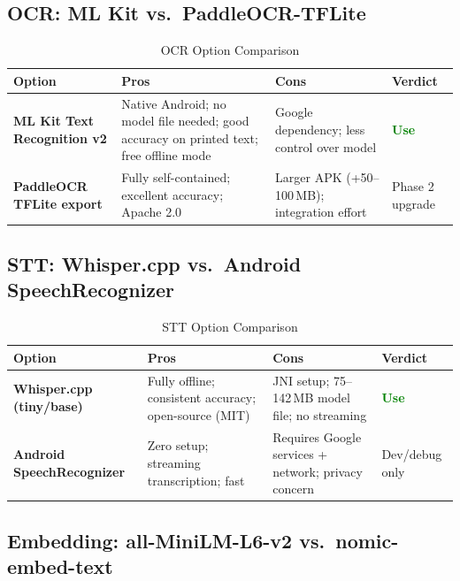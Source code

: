 \documentclass[11pt,a4paper]{article}
\begin{document}
\subsection{OCR: ML Kit vs.\ PaddleOCR-TFLite}

\begin{table}[h!]
\centering
\renewcommand{\arraystretch}{1.3}
\begin{tabularx}{\textwidth}{L{3cm} L{4.5cm} L{4.5cm} C{2cm}}
\toprule
\textbf{Option} & \textbf{Pros} & \textbf{Cons} & \textbf{Verdict} \\
\midrule
\textbf{ML Kit Text Recognition v2}
  & Native Android; no model file needed; good accuracy on printed text; free offline mode
  & Google dependency; less control over model
  & \textcolor{green}{\textbf{Use}} \\
\midrule
\textbf{PaddleOCR TFLite export}
  & Fully self-contained; excellent accuracy; Apache 2.0
  & Larger APK (+50--100\,MB); integration effort
  & Phase 2 upgrade \\
\bottomrule
\end{tabularx}
\caption{OCR Option Comparison}
\end{table}

\subsection{STT: Whisper.cpp vs.\ Android SpeechRecognizer}

\begin{table}[h!]
\centering
\renewcommand{\arraystretch}{1.3}
\begin{tabularx}{\textwidth}{L{3cm} L{4.5cm} L{4.5cm} C{2cm}}
\toprule
\textbf{Option} & \textbf{Pros} & \textbf{Cons} & \textbf{Verdict} \\
\midrule
\textbf{Whisper.cpp (tiny/base)}
  & Fully offline; consistent accuracy; open-source (MIT)
  & JNI setup; 75--142\,MB model file; no streaming
  & \textcolor{green}{\textbf{Use}} \\
\midrule
\textbf{Android SpeechRecognizer}
  & Zero setup; streaming transcription; fast
  & Requires Google services + network; privacy concern
  & Dev/debug only \\
\bottomrule
\end{tabularx}
\caption{STT Option Comparison}
\end{table}

\subsection{Embedding: all-MiniLM-L6-v2 vs.\ nomic-embed-text}
\end{document}

